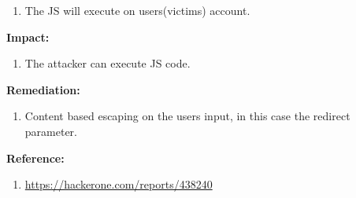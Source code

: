 \documentclass{article}
\begin{document}
\begin{description}[itemsep=2pt, leftmargin=0.2cm]
\begin{enumerate}[leftmargin=0.5cm]
                        \item \large The JS will execute on users(victims) account.
                        \end{enumerate}
                        
                        \item \large \textbf{Impact:}
                        \linespread{1.0}
                        \begin{enumerate}[leftmargin=0.5cm]
                        \item \large The attacker can execute JS code. 
                        \end{enumerate}  
                
                
                        \item \large \textbf{Remediation:}
                        \linespread{1.0}
                        \begin{enumerate}[leftmargin=0.5cm]
                            
                        \item \large Content based escaping on the users input, in this case the redirect parameter.
                        \end{enumerate}

                        \item \large \textbf{Reference:}
                        \linespread{1.0}
                        \begin{enumerate}[leftmargin=0.5cm ]
                            
                        \item \large \textcolor{linkColor}{\url{https://hackerone.com/reports/438240}}
                       
                        \end{enumerate}   
                    \end{description}
                    
                    
                    \newpage
\end{document}
